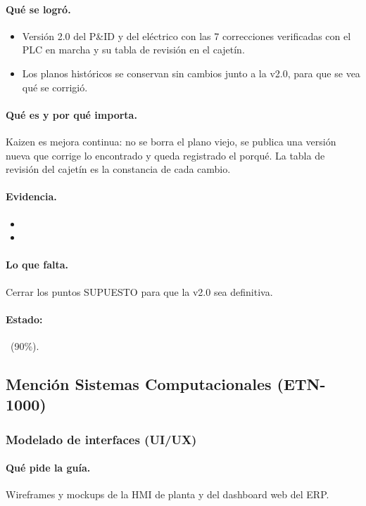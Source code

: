 \documentclass[a4paper,11pt]{article}
\begin{document}
\paragraph{Qué se logró.}
\begin{itemize}
\item Versión 2.0 del P\&ID y del eléctrico con las 7 correcciones verificadas con el PLC en marcha y su tabla de revisión en el cajetín.
\item Los planos históricos se conservan sin cambios junto a la v2.0, para que se vea qué se corrigió.
\end{itemize}
\paragraph{Qué es y por qué importa.} Kaizen es mejora continua: no se borra el plano viejo, se publica una versión nueva que corrige lo encontrado y queda registrado el porqué. La tabla de revisión del cajetín es la constancia de cada cambio.
\paragraph{Evidencia.}
\begin{itemize}\small
\item {}
\item {}
\end{itemize}
\paragraph{Lo que falta.} Cerrar los puntos SUPUESTO para que la v2.0 sea definitiva.
\paragraph{Estado:} \parcial~(90\%).
\subsection{Mención Sistemas Computacionales (ETN-1000)}
\subsubsection{Modelado de interfaces (UI/UX)}
\paragraph{Qué pide la guía.} Wireframes y mockups de la HMI de planta y del dashboard web del ERP.
\end{document}
